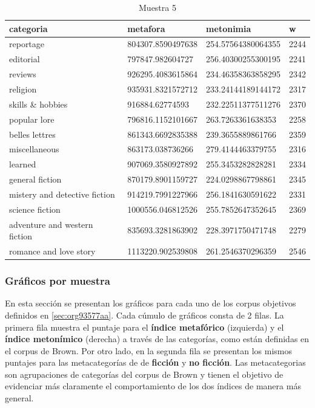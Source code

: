 \documentclass[12pt,letterpaper,twoside]{article}
\begin{document}
\begin{center}
\begin{longtable}{| p{} | p{} | p{}|p{}|}
\caption{Muestra 5}
    \hline
        categoria & metafora & metonimia & w \\ \hline
        reportage & 804307.8590497638 & 254.57564380064355 & 2244 \\ \hline
        editorial & 797847.982604727 & 256.40300255300195 & 2241 \\ \hline
        reviews & 926295.4083615864 & 234.46358363858295 & 2342 \\ \hline
        religion & 935931.8321572712 & 233.24144189144172 & 2317 \\ \hline
        skills \& hobbies & 916884.62774593 & 232.22511377511276 & 2370 \\ \hline
        popular lore & 796816.1152101667 & 263.7263361638353 & 2258 \\ \hline
        belles lettres & 861343.6692835388 & 239.3655889861766 & 2359 \\ \hline
        miscellaneous & 863173.038736266 & 279.4144463379755 & 2316 \\ \hline
        learned & 907069.3580927892 & 255.3453282828281 & 2334 \\ \hline
        general fiction & 870179.8901159727 & 224.0298867798861 & 2345 \\ \hline
        mistery and detective fiction & 914219.7991227966 & 256.1841630591622 & 2331 \\ \hline
        science fiction & 1000556.046812526 & 255.7852647352645 & 2369 \\ \hline
        adventure and western fiction & 835693.3281863902 & 228.3971750471748 & 2279 \\ \hline
        romance and love story & 1113220.902539808 & 261.2546370296359 & 2546 \\ \hline
\end{longtable}
    \label{muestra5}
\end{center}

\normalsize
\subsubsection{Gráficos por muestra}
\label{sec:orge5c44ea}
En esta sección se presentan los gráficos para cada uno de los corpus objetivos
definidos en \ref{sec:org93577aa}. Cada cúmulo de gráficos consta de 2 filas.
La primera fila muestra el puntaje para el \textbf{índice metafórico} (izquierda) y
el \textbf{índice metonímico} (derecha) a través de las categorías, como están
definidas en el corpus de Brown. Por otro lado, en la segunda fila
se presentan los mismos puntajes para las metacategorías de de \textbf{ficción}
y \textbf{no ficción}. Las metacategorias son agrupaciones de categorías del corpus
de Brown y tienen el objetivo de evidenciar más claramente el comportamiento
de los dos índices de manera más general.
\end{document}

